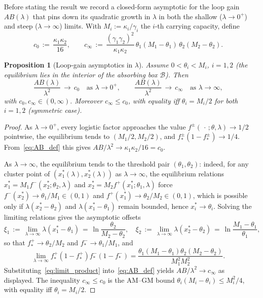 \documentclass[sn-mathphys,Numbered]{sn-jnl}
\theoremstyle{thmstyleone}
\newtheorem{proposition}[theorem]{Proposition}
\theoremstyle{thmstyletwo}
\theoremstyle{thmstylethree}
\begin{document}
Before stating the result we record a closed-form asymptotic for the
loop gain $AB(\lambda)$ that pins down its quadratic growth in
$\lambda$ in both the shallow ($\lambda\to 0^+$) and steep
($\lambda\to\infty$) limits. With $M_i:=\kappa_i/\gamma_i$ the
$i$-th carrying capacity, define
\begin{equation}
c_0 \,:=\, \frac{\kappa_1\kappa_2}{16},
\qquad
c_\infty \,:=\,
\frac{(\gamma_1\gamma_2)^2}{\kappa_1\kappa_2}\,
\theta_1(M_1-\theta_1)\,\theta_2(M_2-\theta_2).
\label{eq:cinfty_def}
\end{equation}

\begin{proposition}[Loop-gain asymptotics in $\lambda$]
\label{prop:AB_asymptotics}
Assume $0<\theta_i<M_i$, $i=1,2$ (the equilibrium lies in the interior of
the absorbing box $\mathcal{B}$). Then
\begin{equation}
\frac{AB(\lambda)}{\lambda^2}\,\longrightarrow\, c_0
\quad\text{as }\lambda\to 0^+,
\qquad
\frac{AB(\lambda)}{\lambda^2}\,\longrightarrow\, c_\infty
\quad\text{as }\lambda\to\infty,
\label{eq:AB_limits}
\end{equation}
with $c_0,c_\infty\in(0,\infty)$. Moreover $c_\infty\leq c_0$, with
equality iff $\theta_i=M_i/2$ for both $i=1,2$ (symmetric case).
\end{proposition}
\begin{proof}
As $\lambda\to 0^+$, every logistic factor approaches the value
$f^\pm(\,\cdot\,;\theta,\lambda)\to 1/2$ pointwise, the equilibrium tends
to $(M_1/2,M_2/2)$, and $f^\pm_*(1-f^\pm_*)\to 1/4$. From~\eqref{eq:AB_def}
this gives $AB/\lambda^2 \to \kappa_1\kappa_2/16 = c_0$.

As $\lambda\to\infty$, the equilibrium tends to the threshold pair
$(\theta_1,\theta_2)$: indeed, for any cluster point of
$(x_1^*(\lambda),x_2^*(\lambda))$ as $\lambda\to\infty$,
the equilibrium relations
$x_1^* = M_1 f^-(x_2^*;\theta_2,\lambda)$ and
$x_2^* = M_2 f^+(x_1^*;\theta_1,\lambda)$ force
$f^-(x_2^*)\to\theta_1/M_1\in(0,1)$ and $f^+(x_1^*)\to\theta_2/M_2\in(0,1)$,
which is possible only if $\lambda(x_2^*-\theta_2)$ and
$\lambda(x_1^*-\theta_1)$ remain bounded, hence $x_i^*\to\theta_i$.
Solving the limiting relations gives the asymptotic offsets
\begin{equation}
\xi_1 \,:=\, \lim_{\lambda\to\infty}\lambda(x_1^*-\theta_1)
\,=\, \ln\!\frac{\theta_2}{M_2-\theta_2},
\quad
\xi_2 \,:=\, \lim_{\lambda\to\infty}\lambda(x_2^*-\theta_2)
\,=\, \ln\!\frac{M_1-\theta_1}{\theta_1},
\label{eq:xi_limits}
\end{equation}
so that $f^+_*\to\theta_2/M_2$ and $f^-_*\to\theta_1/M_1$, and
\begin{equation}
\lim_{\lambda\to\infty}f^+_*(1-f^+_*) f^-_*(1-f^-_*)
=\frac{\theta_1(M_1-\theta_1)\theta_2(M_2-\theta_2)}{M_1^2 M_2^2}.
\label{eq:limit_product}
\end{equation}
Substituting~\eqref{eq:limit_product} into~\eqref{eq:AB_def} yields
$AB/\lambda^2 \to c_\infty$ as displayed. The inequality
$c_\infty\leq c_0$ is the AM--GM bound
$\theta_i(M_i-\theta_i)\leq M_i^2/4$, with equality iff $\theta_i=M_i/2$.
\end{proof}
\end{document}
